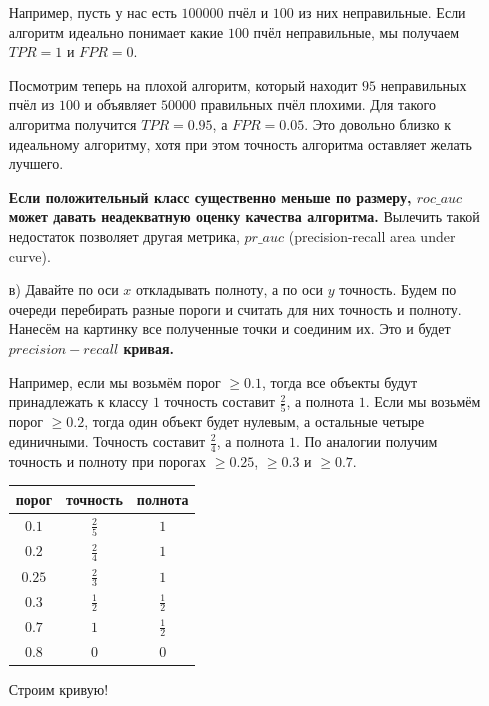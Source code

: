 \documentclass[12pt, a4paper, oneside]{article}
\theoremstyle{plain} %
\theoremstyle{definition}
\newcommand{\indef}[1]{\textbf{ \color{green} #1}}
\begin{document}
\begin{solution}
\begin{enumerate}
    Например, пусть у нас есть $100 000$ пчёл и $100$ из них неправильные. Если алгоритм идеально понимает какие $100$ пчёл неправильные, мы получаем $TPR = 1$ и $FPR = 0$. 
    
    Посмотрим теперь на плохой алгоритм, который находит $95$ неправильных пчёл из $100$ и объявляет $50 000$ правильных пчёл плохими. Для такого алгоритма получится $TPR = 0.95$, а $FPR = 0.05$. Это довольно близко к идеальному алгоритму, хотя при этом точность алгоритма оставляет желать лучшего. 
    
    \indef{Если положительный класс существенно меньше по размеру, $roc\_auc$ может давать неадекватную оценку качества алгоритма.} Вылечить такой недостаток позволяет другая метрика, $pr\_auc$ (precision-recall area under curve). 

	\item[в)] Давайте по оси $x$ откладывать полноту, а по оси $y$ точность. Будем по очереди перебирать разные пороги и считать для них точность и полноту. Нанесём на картинку все полученные точки и соединим их. Это и будет \indef{$precision-recall$ кривая.}
	
	Например, если мы возьмём порог $ \ge 0.1$, тогда все объекты будут принадлежать к классу $1$ точность составит $\frac{2}{5}$, а полнота $1$.  Если мы возьмём порог $\ge 0.2$, тогда один объект будет нулевым, а остальные четыре единичными.  Точность составит $\frac{2}{4}$, а полнота $1$.  По аналогии получим точность и полноту при порогах $\ge 0.25$, $\ge 0.3$ и $\ge 0.7$. 
	
	\begin{center}
		\begin{tabular}{c|c|c}
			порог &точность  & полнота\\
			\hline
			$0.1$ & $\frac{2}{5}$ & $1$ \\
			$0.2$ & $\frac{2}{4}$ & $1$ \\
			$0.25$ & $\frac{2}{3}$ & $1$ \\
			$0.3$ & $\frac{1}{2}$ & $\frac{1}{2}$ \\
			$0.7$ & $1$& $\frac{1}{2}$ \\
			$0.8$ & $0$ & $0$ \\
		\end{tabular}
	\end{center}
	
	Строим кривую! 

\begin{center}
    \begin{tikzpicture}[line cap=round,line join=round,x=5cm,y=5cm]
    

\end{tikzpicture}
\end{center}
\end{enumerate}
\end{solution}
\end{document}
